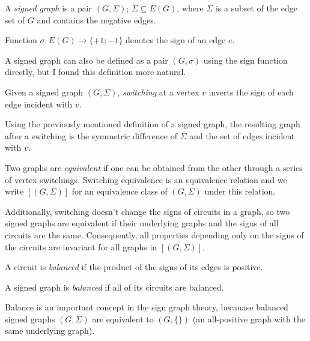 \begin{definition}
    A \textit{signed graph} is a pair $(G, \Sigma)$; $\Sigma \subseteq E(G)$, where $\Sigma$ is a subset of the edge set of $G$ and contains the negative edges.
\end{definition}

\begin{definition}
    Function $\sigma : E(G) \rightarrow \{+1; -1\}$ denotes the sign of an edge $e$.
\end{definition}

A signed graph can also be defined as a pair $(G, \sigma)$ using the sign function directly,
but I found this definition more natural.

\begin{definition}
    Given a signed graph $(G, \Sigma)$, \textit{switching} at a vertex $v$ inverts the sign of each edge
    incident with $v$. 
\end{definition}

Using the previously mentioned definition of a signed graph, the resulting graph after a switching
is the symmetric difference of $\Sigma$ and the set of edges incident with $v$.

\begin{definition}
    Two graphs are \textit{equivalent} if one can be obtained from the other through a series of vertex switchings.
    Switching equivalence is an equivalence relation and we write $[(G, \Sigma)]$ for an equivalence class of $(G, \Sigma)$ under this relation.
\end{definition}

Additionally, switching doesn't change the signs of circuits in a graph, so two signed graphs 
are equivalent if their underlying graphs and the signs of all circuits are the same. 
Consequently, all properties depending only on the signs of the circuits are invariant for all graphs in $[(G, \Sigma)]$.

\begin{definition}
    A circuit is \textit{balanced} if the product of the signs of its edges is positive.
\end{definition}

\begin{definition}
    A signed graph is \textit{balanced} if all of its circuits are balanced.
\end{definition}

Balance is an important concept in the sign graph theory, becauase balanced signed graphs $(G, \Sigma)$ are equivalent to $(G, \{\})$ (an all-positive graph with the same underlying graph).

